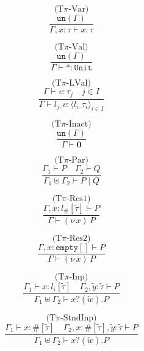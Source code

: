 \documentclass{l4proj}
\begin{document}
\begin{figure}[H]
\begin{subfigure}{0.32\textwidth}
\[\text{(T}\pi\text{-Var)}\]
\[\frac{\texttt{un}(\Gamma)}{\Gamma, x:\tau \vdash x:\tau}\]
\vspace{\fill}
\end{subfigure}
\begin{subfigure}{0.32\textwidth}
\[\text{(T}\pi\text{-Val)}\]
\[\frac{\texttt{un}(\Gamma)}{\Gamma \vdash \texttt{*} : \texttt{Unit}}\]
\vspace{\fill}
\end{subfigure}
\begin{subfigure}{0.32\textwidth}
\[\text{(T}\pi\text{-LVal)}\]
\[\frac{\Gamma \vdash v : \tau_{j} \quad j \in I}{\Gamma \vdash l_{j}\_v : \langle l_{i}\_\tau_{i} \rangle _{i \in I}}\]
\end{subfigure}
\begin{subfigure}{0.24\textwidth}
\[\text{(T}\pi\text{-Inact)}\]
\[\frac{\texttt{un}(\Gamma)}{\Gamma \vdash \textbf{0}}\]
\vspace{\fill}
\end{subfigure}
\begin{subfigure}{0.24\textwidth}
\[\text{(T}\pi\text{-Par)}\]
\[\frac{\Gamma_{1} \vdash P \quad \Gamma_{2} \vdash Q}{\Gamma_{1} \uplus \Gamma_{2} \vdash P \mid Q}\]
\vspace{\fill}
\end{subfigure}
\begin{subfigure}{0.24\textwidth}
\[\text{(T}\pi\text{-Res1)}\]
\[\frac{\Gamma, x:l_{\#}[\tilde{\tau}]\vdash P}{\Gamma \vdash (\nu\,x)\,P}\]
\vspace{\fill}
\end{subfigure}
\begin{subfigure}{0.24\textwidth}
\[\text{(T}\pi\text{-Res2)}\]
\[\frac{\Gamma, x:\texttt{empty}[]\vdash P}{\Gamma \vdash (\nu\,x)\,P}\]
\vspace{\fill}
\end{subfigure}
\begin{subfigure}{0.48\textwidth}
\[\text{(T}\pi\text{-Inp)}\]
\[\frac{\Gamma_{1} \vdash x : l_{i}[\tilde{\tau}] \quad \Gamma_{2}, \tilde{y} : \tilde{\tau} \vdash P}{\Gamma_{1} \uplus \Gamma_{2} \vdash x\texttt{?}(\tilde{w}).P}\]
\vspace{\fill}
\end{subfigure}
\begin{subfigure}{0.48\textwidth}
\[\text{(T}\pi\text{-StndInp)}\]
\[\frac{\Gamma_{1} \vdash x : \#[\tilde{\tau}] \quad \Gamma_{2}, x : \#[\tilde{\tau}], \tilde{y} : \tilde{\tau} \vdash P}{\Gamma_{1} \uplus \Gamma_{2} \vdash x\texttt{?}(\tilde{w}).P}\]

\end{subfigure}
\end{figure}
\end{document}
